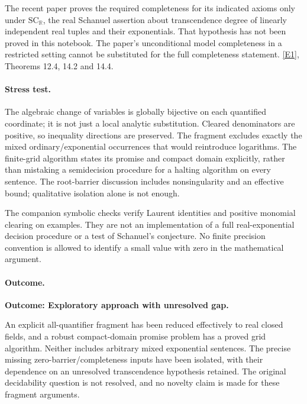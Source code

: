 \documentclass[11pt,a4paper]{article}
\newcommand{\R}{\mathbb{R}}
\newcommand{\eref}[2]{\hyperlink{extra:#1:#2}{[E#2]}}
\numberwithin{equation}{section}
\begin{document}
The recent paper proves the required completeness for its indicated
axioms only under $\mathrm{SC}_{\R}$, the real Schanuel assertion about
transcendence degree of linearly independent real tuples and their
exponentials.  That hypothesis has not been proved in this notebook.
The paper's unconditional model completeness in a restricted setting
cannot be substituted for the full completeness statement.
\eref{1462}{1}, Theorems 12.4, 14.2 and 14.4.

\paragraph{Stress test.}
The algebraic change of variables is globally bijective on each
quantified coordinate; it is not just a local analytic substitution.
Cleared denominators are positive, so inequality directions are
preserved.  The fragment excludes exactly the mixed ordinary/exponential
occurrences that would reintroduce logarithms.  The finite-grid algorithm
states its promise and compact domain explicitly, rather than mistaking
a semidecision procedure for a halting algorithm on every sentence.
The root-barrier discussion includes nonsingularity and an effective
bound; qualitative isolation alone is not enough.

The companion symbolic checks verify Laurent identities and positive
monomial clearing on examples.  They are not an implementation of a
full real-exponential decision procedure or a test of Schanuel's
conjecture.  No finite precision convention is allowed to identify a
small value with zero in the mathematical argument.

\paragraph{Outcome.}
\textbf{Outcome: Exploratory approach with unresolved gap.}

An explicit all-quantifier fragment has been reduced effectively to
real closed fields, and a robust compact-domain promise problem has a
proved grid algorithm.  Neither includes arbitrary mixed exponential
sentences.  The precise missing zero-barrier/completeness inputs have
been isolated, with their dependence on an unresolved transcendence
hypothesis retained.  The original decidability question is not resolved,
and no novelty claim is made for these fragment arguments.
\end{document}

